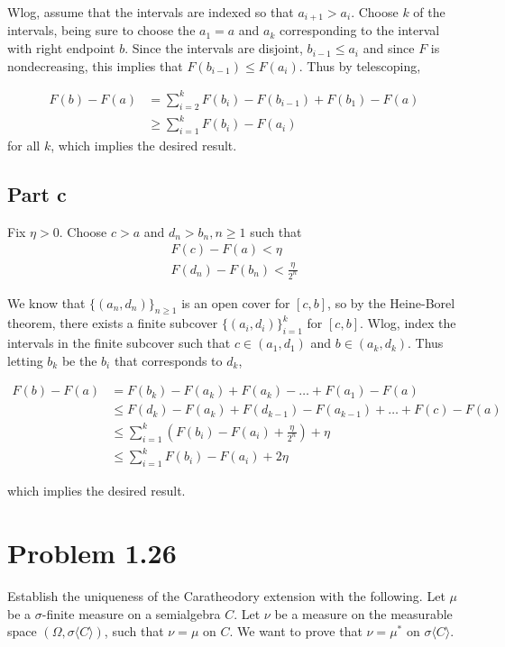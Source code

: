 \documentclass{article}
\begin{document}
Wlog, assume that the intervals are indexed so that $a_{i+1} > a_i$. Choose $k$ of the intervals, being sure to choose the $a_1 = a$ and $a_k$ corresponding to the interval with right endpoint $b$. Since the intervals are disjoint, $b_{i-1} \leq a_i$ and since $F$ is nondecreasing, this implies that $F(b_{i-1}) \leq F(a_i)$. Thus by telescoping,

\begin{align*}
F(b) - F(a) &= \sum_{i=2}^k F(b_i) - F(b_{i-1}) + F(b_1) - F(a) \\
&\geq \sum_{i=1}^k F(b_i) - F(a_i)
\end{align*}
for all $k$, which implies the desired result.

\subsection*{Part c}

Fix $\eta > 0$. Choose $c>a$ and $d_n > b_n, n \geq 1$ such that
\begin{gather*}
F(c) - F(a) < \eta \\
F(d_n) - F(b_n) < \frac{\eta}{2^n}
\end{gather*}

We know that $\{(a_n, d_n)\}_{n \geq 1}$ is an open cover for $[c, b]$, so by the Heine-Borel theorem, there exists a finite subcover $\{(a_i, d_i)\}_{i=1}^k$ for $[c, b]$. Wlog, index the intervals in the finite subcover such that $c \in (a_1, d_1)$ and $b \in (a_k, d_k)$. Thus letting $b_k$ be the $b_i$ that corresponds to $d_k$,

\begin{align*}
F(b) - F(a) &= F(b_k) - F(a_k) + F(a_k) - \dots +F(a_1) - F(a) \\
&\leq F(d_k) - F(a_k) + F(d_{k-1}) - F(a_{k-1}) + \dots + F(c) - F(a) \\
&\leq \sum_{i=1}^k \left(F(b_i) - F(a_i) + \frac{\eta}{2^n}\right) + \eta \\
&\leq \sum_{i=1}^k F(b_i) - F(a_i) + 2\eta
\end{align*}

which implies the desired result.

\section*{Problem 1.26}

Establish the uniqueness of the Caratheodory extension with the following. Let $\mu$ be a $\sigma$-finite measure on a semialgebra $C$. Let $\nu$ be a measure on the measurable space $(\Omega, \sigma\langle C\rangle)$, such that $\nu = \mu$ on $C$. We want to prove that $\nu = \mu^*$ on $\sigma\langle C\rangle$.
\end{document}
